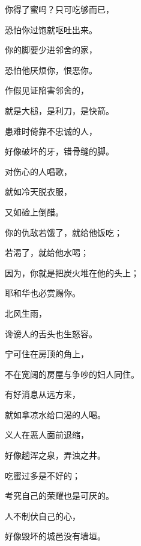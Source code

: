 {\par }{\Q {}你得了蜜吗？只可吃够而已，
\par }{\Q 恐怕你过饱就呕吐出来。
\par }{\Q {}你的脚要少进邻舍的家，
\par }{\Q 恐怕他厌烦你，恨恶你。
\par }{\Q {}作假见证陷害邻舍的，
\par }{\Q 就是大槌，是利刀，是快箭。
\par }{\Q {}患难时倚靠不忠诚的人，
\par }{\Q 好像破坏的牙，错骨缝的脚。
\par }{\Q {}对伤心的人唱歌，
\par }{\Q 就如冷天脱衣服，
\par }{\Q 又如硷上倒醋。
\par }{\Q {}你的仇敌若饿了，就给他饭吃；
\par }{\Q 若渴了，就给他水喝；
\par }{\Q {}因为，你{}就是把炭火堆在他的头上；
\par }{\Q 耶和华也必赏赐你。
\par }{\Q {}北风生雨，
\par }{\Q 谗谤人的舌头也生怒容。
\par }{\Q {}宁可住在房顶的角上，
\par }{\Q 不在宽阔的房屋与争吵的妇人同住。
\par }{\Q {}有好消息从远方来，
\par }{\Q 就如拿凉水给口渴的人喝。
\par }{\Q {}义人在恶人面前退缩，
\par }{\Q 好像趟浑之泉，弄浊之井。
\par }{\Q {}吃蜜过多是不好的；
\par }{\Q 考究自己的荣耀也是可厌的。
\par }{\Q {}人不制伏自己的心，
\par }{\Q 好像毁坏的城邑没有墙垣。

}
